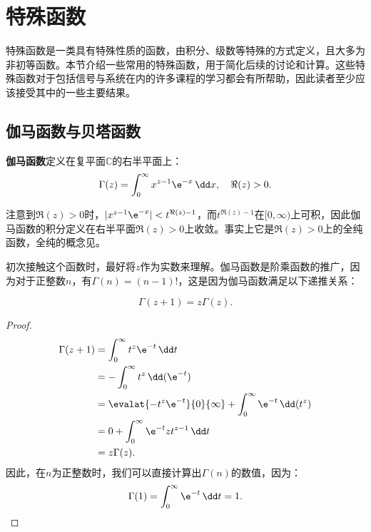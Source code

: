 \section{特殊函数}\label{sec:special_function}

特殊函数是一类具有特殊性质的函数，由积分、级数等特殊的方式定义，且大多为非初等函数。本节介绍一些常用的特殊函数，用于简化后续的讨论和计算。这些特殊函数对于包括信号与系统在内的许多课程的学习都会有所帮助，因此读者至少应该接受其中的一些主要结果。

\subsection{伽马函数与贝塔函数}\label{sub:Gamma}

\begin{definition}
    \textbf{伽马函数}定义在复平面$\mathbb{C}$的右半平面上：
    \begin{equation}
        \Gamma(z)=\int_{0}^{\infty}x^{z-1}\e^{-x}\,\dd x,\quad \Re(z)>0.
    \end{equation}
\end{definition}
注意到$\Re(z)>0$时，$|x^{z-1}\e^{-x}|<t^{\Re(z)-1}$，而$t^{\Re(z)-1}$在$[0,\infty)$上可积，因此伽马函数的积分定义在右半平面$\Re(z)>0$上收敛。事实上它是$\Re(z)>0$上的全纯函数，全纯的概念见。

初次接触这个函数时，最好将$z$作为实数来理解。伽马函数是阶乘函数的推广，因为对于正整数$n$，有$\Gamma(n)=(n-1)!$，这是因为伽马函数满足以下递推关系：
\begin{theorem}
    \begin{equation}
        \Gamma(z+1)=z\Gamma(z).
    \end{equation}
\end{theorem}
\begin{proof}
    \begin{align}
        \Gamma(z+1)&=\int_{0}^{\infty}t^{z}\e^{-t}\,\dd t\nonumber\\
                   &=-\int_{0}^{\infty}t^{z}\,\dd(\e^{-t})\nonumber\\
                   &=\evalat{-t^{z}\e^{-t}}{0}{\infty}+\int_{0}^{\infty}\e^{-t}\,\dd(t^{z})\nonumber\\
                   &=0+\int_{0}^{\infty}\e^{-t}zt^{z-1}\,\dd t\nonumber\\
                   &=z\Gamma(z).
    \end{align}
    因此，在$n$为正整数时，我们可以直接计算出$\Gamma(n)$的数值，因为：
    \begin{equation}
        \Gamma(1)=\int_{0}^{\infty}\e^{-t}\,\dd t=1.
    \end{equation}
\end{proof}

